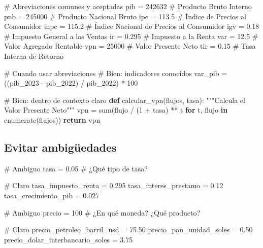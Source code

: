 \documentclass[
  doc,
  floatsintext,
  longtable,
  a4paper,
  nolmodern,
  notxfonts,
  notimes,
  12pt,
  colorlinks=true,linkcolor=blue,citecolor=blue,urlcolor=blue]{apa7}
\newenvironment{Shaded}{\begin{snugshade}}{\end{snugshade}}
\newcommand{\BuiltInTok}[1]{\textcolor[rgb]{0.00,0.23,0.31}{#1}}
\newcommand{\CommentTok}[1]{\textcolor[rgb]{0.37,0.37,0.37}{#1}}
\newcommand{\ControlFlowTok}[1]{\textcolor[rgb]{0.00,0.23,0.31}{\textbf{#1}}}
\newcommand{\DecValTok}[1]{\textcolor[rgb]{0.68,0.00,0.00}{#1}}
\newcommand{\FloatTok}[1]{\textcolor[rgb]{0.68,0.00,0.00}{#1}}
\newcommand{\KeywordTok}[1]{\textcolor[rgb]{0.00,0.23,0.31}{\textbf{#1}}}
\newcommand{\NormalTok}[1]{\textcolor[rgb]{0.00,0.23,0.31}{#1}}
\newcommand{\OperatorTok}[1]{\textcolor[rgb]{0.37,0.37,0.37}{#1}}
\begin{document}
\begin{Shaded}
\begin{Highlighting}[]
\CommentTok{\# Abreviaciones comunes y aceptadas}
\NormalTok{pib }\OperatorTok{=} \DecValTok{242632}  \CommentTok{\# Producto Bruto Interno}
\NormalTok{pnb }\OperatorTok{=} \DecValTok{245000}  \CommentTok{\# Producto Nacional Bruto}
\NormalTok{ipc }\OperatorTok{=} \FloatTok{113.5}   \CommentTok{\# Índice de Precios al Consumidor}
\NormalTok{inpc }\OperatorTok{=} \FloatTok{115.2}  \CommentTok{\# Índice Nacional de Precios al Consumidor}
\NormalTok{igv }\OperatorTok{=} \FloatTok{0.18}    \CommentTok{\# Impuesto General a las Ventas}
\NormalTok{ir }\OperatorTok{=} \FloatTok{0.295}    \CommentTok{\# Impuesto a la Renta}
\NormalTok{var }\OperatorTok{=} \FloatTok{12.5}    \CommentTok{\# Valor Agregado Rentable}
\NormalTok{vpn }\OperatorTok{=} \DecValTok{25000}   \CommentTok{\# Valor Presente Neto}
\NormalTok{tir }\OperatorTok{=} \FloatTok{0.15}    \CommentTok{\# Tasa Interna de Retorno}

\CommentTok{\# Cuando usar abreviaciones}
\CommentTok{\# Bien: indicadores conocidos}
\NormalTok{var\_pib }\OperatorTok{=}\NormalTok{ ((pib\_2023 }\OperatorTok{{-}}\NormalTok{ pib\_2022) }\OperatorTok{/}\NormalTok{ pib\_2022) }\OperatorTok{*} \DecValTok{100}

\CommentTok{\# Bien: dentro de contexto claro}
\KeywordTok{def}\NormalTok{ calcular\_vpn(flujos, tasa):}
    \CommentTok{"""Calcula el Valor Presente Neto"""}
\NormalTok{    vpn }\OperatorTok{=} \BuiltInTok{sum}\NormalTok{(flujo }\OperatorTok{/}\NormalTok{ (}\DecValTok{1} \OperatorTok{+}\NormalTok{ tasa) }\OperatorTok{**}\NormalTok{ t }\ControlFlowTok{for}\NormalTok{ t, flujo }\KeywordTok{in} \BuiltInTok{enumerate}\NormalTok{(flujos))}
    \ControlFlowTok{return}\NormalTok{ vpn}
\end{Highlighting}
\end{Shaded}

\subsection{Evitar ambigüedades}\label{evitar-ambiguxfcedades}

\begin{Shaded}
\begin{Highlighting}[]
\CommentTok{\# Ambiguo}
\NormalTok{tasa }\OperatorTok{=} \FloatTok{0.05}  \CommentTok{\# ¿Qué tipo de tasa?}

\CommentTok{\# Claro}
\NormalTok{tasa\_impuesto\_renta }\OperatorTok{=} \FloatTok{0.295}
\NormalTok{tasa\_interes\_prestamo }\OperatorTok{=} \FloatTok{0.12}
\NormalTok{tasa\_crecimiento\_pib }\OperatorTok{=} \FloatTok{0.027}

\CommentTok{\# Ambiguo}
\NormalTok{precio }\OperatorTok{=} \DecValTok{100}  \CommentTok{\# ¿En qué moneda? ¿Qué producto?}

\CommentTok{\# Claro}
\NormalTok{precio\_petroleo\_barril\_usd }\OperatorTok{=} \FloatTok{75.50}
\NormalTok{precio\_pan\_unidad\_soles }\OperatorTok{=} \FloatTok{0.50}
\NormalTok{precio\_dolar\_interbancario\_soles }\OperatorTok{=} \FloatTok{3.75}
\end{Highlighting}
\end{Shaded}
\end{document}
